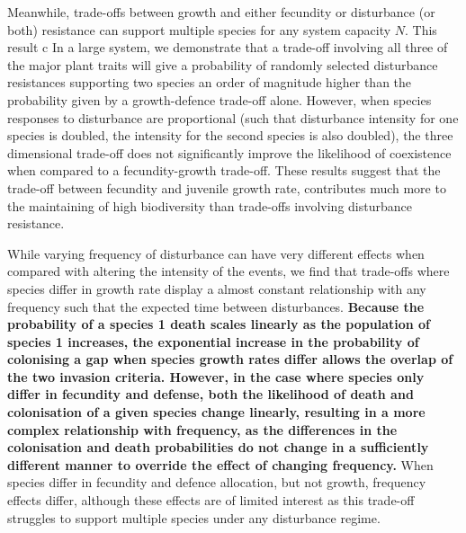 \documentclass[preprint,10pt,reqno]{amsart}
\begin{document}
Meanwhile, trade-offs between growth and either fecundity or disturbance (or both) resistance can support multiple species for any system capacity $N$. This result c In a large system, we demonstrate that a trade-off involving all three of the major plant traits will give a probability of randomly selected disturbance resistances supporting two species an order of magnitude higher than the probability given by a growth-defence trade-off alone. However, when species responses to disturbance are proportional (such that disturbance intensity for one species is doubled, the intensity for the second species is also doubled), the three dimensional trade-off does not significantly improve the likelihood of coexistence when compared to a fecundity-growth trade-off. These results suggest that the trade-off between fecundity and juvenile growth rate, contributes much more to the maintaining of high biodiversity than trade-offs involving disturbance resistance.  

While varying frequency of disturbance can have very different effects when compared with altering the intensity of the events, we find that trade-offs where species differ in growth rate display a almost constant relationship with any frequency such that the expected time between disturbances. \textbf{Because the probability of a species 1 death scales linearly as the population of species 1 increases, the exponential increase in the probability of colonising a gap when species growth rates differ allows the overlap of the two invasion criteria. However, in the case where species only differ in fecundity and defense, both the likelihood of death and colonisation of a given species change linearly, resulting in a more complex relationship with frequency, as the differences in the colonisation and death probabilities do not change in a sufficiently different manner to override the effect of changing frequency.} When species differ in fecundity and defence allocation, but not growth, frequency effects differ, although these effects are of limited interest as this trade-off struggles to support multiple species under any disturbance regime.
\end{document}
